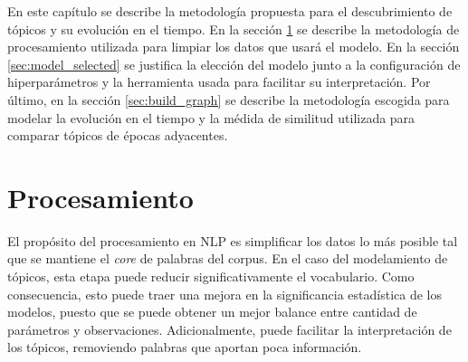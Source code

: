 En este capítulo se describe la metodología propuesta para el descubrimiento de tópicos y su evolución en el tiempo. En la sección \ref{sec:processing} se describe la metodología de procesamiento utilizada para limpiar los datos que usará el modelo. En la sección \ref{sec:model_selected} se justifica la elección del modelo junto a la configuración de hiperparámetros y la herramienta usada para facilitar su interpretación. Por último, en la sección \ref{sec:build_graph} se describe la metodología escogida para modelar la evolución en el tiempo y la médida de similitud utilizada para comparar tópicos de épocas adyacentes.

\section{Procesamiento}
\label{sec:processing}

El propósito del procesamiento en NLP es simplificar los datos lo más posible tal que se mantiene el \textit{core} de palabras del corpus. En el caso del modelamiento de tópicos, esta etapa puede reducir significativamente el vocabulario. Como consecuencia, esto puede traer una mejora en la significancia estadística de los modelos, puesto que se puede obtener un mejor balance entre cantidad de parámetros y observaciones. Adicionalmente, puede facilitar la interpretación de los tópicos, removiendo palabras que aportan poca información.\\

